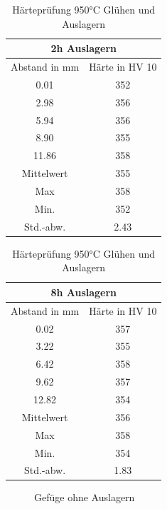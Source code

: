 \documentclass[a4paper, 11pt]{tubsreprt}
\begin{document}
\begin{table}[t] %
\begin{tabular}{c|c}
\multicolumn{2}{c}{2h Auslagern} \\
\hline
Abstand in mm	& Härte in HV 10 \\
0.01	&	352 \\
2.98	&	356 \\
5.94	&	356 \\
8.90	&	355 \\
11.86	&	358 \\
Mittelwert	&	355 \\
Max	&	358 \\
Min.	&	352 \\
Std.-abw.	&	2.43 \\

\end{tabular}
\begin{tabular}{c|c}
\multicolumn{2}{c}{8h Auslagern} \\
\hline
Abstand in mm	&	Härte in HV 10 \\
0.02	&	357 \\
3.22	&	355 \\
6.42	&	358 \\
9.62	&	357 \\
12.82	&	354 \\
Mittelwert	&	356 \\
Max	&	358 \\
Min.	&	354 \\
Std.-abw.	&	1.83 \\

\end{tabular}
\caption{Härteprüfung 950°C Glühen und Auslagern}
\label{950alterung}
\end{table}
\begin{figure} %
	\caption{Gefüge ohne Auslagern}
	\label{Gefüge ohne Alterung}
\end{figure}
\end{document}
